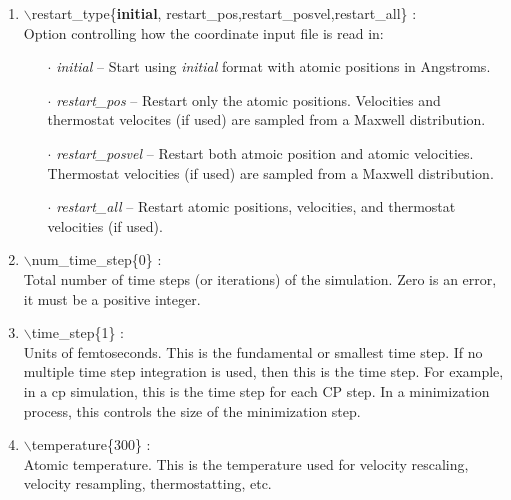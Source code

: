 \documentclass[12pt,titlepage]{article}
\begin{document}
\begin{enumerate}
 \vspace{0.15in} 
 \item  $\backslash$restart\_type\{{\bf initial},
             restart\_pos,restart\_posvel,restart\_all\} : \\
     Option controlling how the coordinate input file is read in:
     \begin{itemize}
       \item[$\cdot$] {\it initial} -- Start using {\it initial} format 
                                        with atomic positions in Angstroms.
       \item[$\cdot$] {\it restart\_pos} -- Restart only the atomic positions.
                    Velocities and thermostat velocites (if used) are 
                    sampled from a Maxwell distribution.
       \item[$\cdot$] {\it restart\_posvel} -- Restart both atmoic position 
                     and atomic velocities.  Thermostat velocities (if used) 
                     are sampled from a Maxwell distribution.
       \item[$\cdot$] {\it restart\_all} -- Restart atomic positions, 
                     velocities, and thermostat velocities (if used).
     \end{itemize}



 \vspace{0.15in} 
 \item  $\backslash$num\_time\_step\{0\} : \\
Total number of time steps (or iterations) of the simulation.  Zero is
an error, it must be a positive integer.  

 \vspace{0.15in} 
 \item   $\backslash$time\_step\{1\} : \\
Units of femtoseconds.  This is the fundamental or smallest time
step. If no multiple time step integration is used, then this is the
time step.  For example, in a cp simulation, this is the time step for
each CP step.  In a minimization process, this controls the size of
the minimization step.


 \vspace{0.15in} 
 \item   $\backslash$temperature\{300\} : \\
     Atomic temperature.  This is the temperature used for velocity rescaling,
     velocity resampling, thermostatting, etc.



\end{enumerate}
\end{document}
